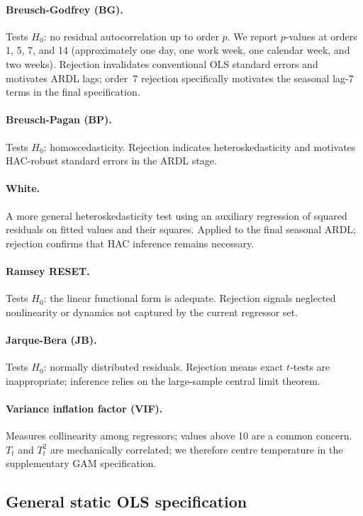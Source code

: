 \documentclass[12pt,a4paper]{article}
\begin{document}
\paragraph{Breusch-Godfrey (BG).} Tests $H_0$: no residual autocorrelation up to order $p$. We report $p$-values at orders 1, 5, 7, and 14 (approximately one day, one work week, one calendar week, and two weeks). Rejection invalidates conventional OLS standard errors and motivates ARDL lags; order~7 rejection specifically motivates the seasonal lag-7 terms in the final specification.

\paragraph{Breusch-Pagan (BP).} Tests $H_0$: homoscedasticity. Rejection indicates heteroskedasticity and motivates HAC-robust standard errors in the ARDL stage.

\paragraph{White.} A more general heteroskedasticity test using an auxiliary regression of squared residuals on fitted values and their squares. Applied to the final seasonal ARDL; rejection confirms that HAC inference remains necessary.

\paragraph{Ramsey RESET.} Tests $H_0$: the linear functional form is adequate. Rejection signals neglected nonlinearity or dynamics not captured by the current regressor set.

\paragraph{Jarque-Bera (JB).} Tests $H_0$: normally distributed residuals. Rejection means exact $t$-tests are inappropriate; inference relies on the large-sample central limit theorem.

\paragraph{Variance inflation factor (VIF).} Measures collinearity among regressors; values above 10 are a common concern. $T_t$ and $T_t^2$ are mechanically correlated; we therefore centre temperature in the supplementary GAM specification.

\subsection{General static OLS specification}
\label{sec:ols-general}
\end{document}
